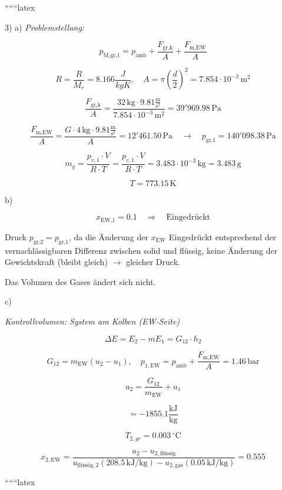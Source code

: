 
``````latex


3) a) \textit{Problemstellung:} 

\[
p_{\text{M,gr,1}} = p_{\text{amb}} + \frac{F_{\text{gr,k}}}{A} + \frac{F_{\text{m,EW}}}{A}
\]

\[
R = \frac{R}{M_r} = 8.166 \frac{J}{kgK}, \quad A = \pi \left( \frac{d}{2} \right)^2 = 7.854 \cdot 10^{-3} \, \text{m}^2
\]

\[
\frac{F_{\text{gr,k}}}{A} = \frac{32 \, \text{kg} \cdot 9.81 \frac{\text{m}}{\text{s}^2}}{7.854 \cdot 10^{-3} \, \text{m}^2} = 39'969.98 \, \text{Pa}
\]

\[
\frac{F_{\text{m,EW}}}{A} = \frac{G \cdot 4 \, \text{kg} \cdot 9.81 \frac{\text{m}}{\text{s}^2}}{A} = 12'461.50 \, \text{Pa} \quad \rightarrow \quad p_{\text{gr,1}} = 140'098.38 \, \text{Pa}
\]

\[
m_{g} = \frac{p_{v,1} \cdot V}{R \cdot T} = \frac{p_{v,1} \cdot V}{R \cdot T} = 3.483 \cdot 10^{-3} \, \text{kg} = 3.483 \, \text{g}
\]

\[
T = 773.15 \, \text{K}
\]

b) 

\[
x_{\text{EW,1}} = 0.1 \quad \Rightarrow \quad \text{Eingedrückt}
\]

Druck $p_{\text{gr,2}} = p_{\text{gr,1}}$, da die Änderung der $x_{\text{EW}}$ Eingedrückt entsprechend der vernachlässigbaren Differenz zwischen solid und flüssig, keine Änderung der Gewichtskraft (bleibt gleich) $\rightarrow$ gleicher Druck.

Das Volumen des Gases ändert sich nicht.

c) 

\textit{Kontrollvolumen: System am Kolben (EW-Seite)}

\[
\Delta E = E_2 - m E_1 = G_{12} \cdot h_2
\]

\[
G_{12} = m_{\text{EW}} (u_2 - u_1), \quad p_{1,\text{EW}} = p_{\text{amb}} + \frac{F_{\text{m,EW}}}{A} = 1.46 \, \text{bar}
\]

\[
u_2 = \frac{G_{12}}{m_{\text{EW}}} + u_1
\]

\[
= -1855.1 \frac{\text{kJ}}{\text{kg}}
\]

\[
T_{2,gr} = 0.003 \, ^\circ \text{C}
\]

\[
x_{2,\text{EW}} = \frac{u_2 - u_{2,\text{flüssig}}}{u_{\text{flüssig},2} (208.5 \, \text{kJ/kg}) - u_{2,\text{gas}} (0.05 \, \text{kJ/kg})} = 0.555
\]

``````latex


